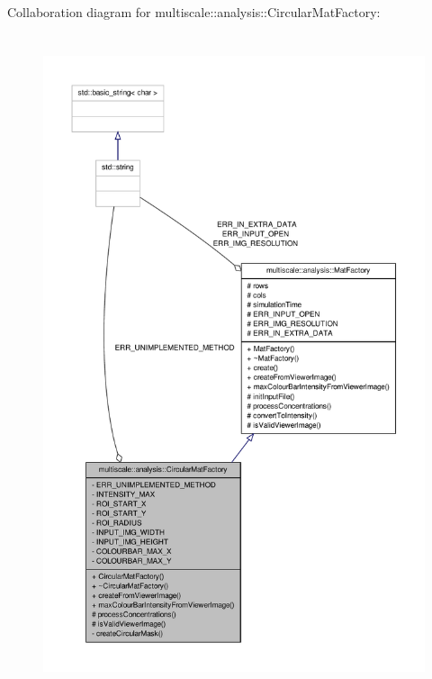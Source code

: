 \-Collaboration diagram for multiscale\-:\-:analysis\-:\-:\-Circular\-Mat\-Factory\-:
\nopagebreak
\begin{figure}[H]
\begin{center}
\leavevmode
\includegraphics[height=550pt]{classmultiscale_1_1analysis_1_1CircularMatFactory__coll__graph}
\end{center}
\end{figure}
